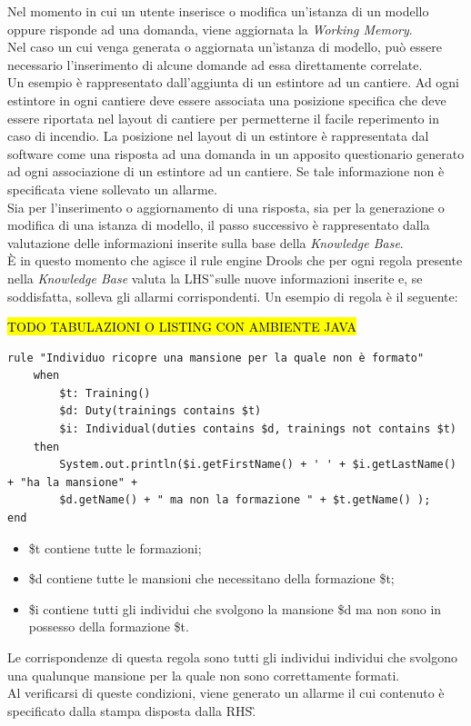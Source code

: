 Nel momento in cui un utente inserisce o modifica un'istanza di un modello oppure risponde ad una domanda, viene aggiornata la \textit{Working Memory}. \\
Nel caso un cui venga generata o aggiornata un'istanza di modello, può essere necessario l'inserimento di alcune domande ad essa direttamente correlate.\\
Un esempio è rappresentato dall'aggiunta di un estintore ad un cantiere. Ad ogni estintore in ogni cantiere deve essere associata una posizione specifica che deve essere riportata nel layout di cantiere per permetterne il facile reperimento in caso di incendio. La posizione nel layout di un estintore è rappresentata dal software come una risposta ad una domanda in un apposito questionario generato ad ogni associazione di un estintore ad un cantiere. Se tale informazione non è specificata viene sollevato un allarme.\\
Sia per l'inserimento o aggiornamento di una risposta, sia per la generazione o modifica di una istanza di modello, il passo successivo è rappresentato dalla valutazione delle informazioni inserite sulla base della \textit{Knowledge Base}. \\
È in questo momento che agisce il rule engine Drools che per ogni regola presente nella \textit{Knowledge Base} valuta la \gls{LHS}\G\ sulle nuove informazioni inserite e, se soddisfatta, solleva gli allarmi corrispondenti. 
Un esempio di regola è il seguente:

\hl{TODO TABULAZIONI O LISTING CON AMBIENTE JAVA}
\begin{verbatim}
rule "Individuo ricopre una mansione per la quale non è formato"
	when
		$t: Training()
		$d: Duty(trainings contains $t)
		$i: Individual(duties contains $d, trainings not contains $t)
	then
		System.out.println($i.getFirstName() + ' ' + $i.getLastName() + "ha la mansione" +
		$d.getName() + " ma non la formazione " + $t.getName() );
end
\end{verbatim}
\begin{itemize}
	\item \$t contiene tutte le formazioni;
	\item \$d contiene  tutte le mansioni che necessitano della formazione \$t;
	\item \$i contiene tutti gli individui che svolgono la mansione \$d ma non sono in possesso della formazione \$t.
\end{itemize}
Le corrispondenze di questa regola sono tutti gli individui individui che svolgono una qualunque mansione per la quale non sono correttamente formati.\\
Al verificarsi di queste condizioni, viene generato un allarme il cui contenuto è specificato dalla stampa disposta dalla \gls{RHS}\G.



